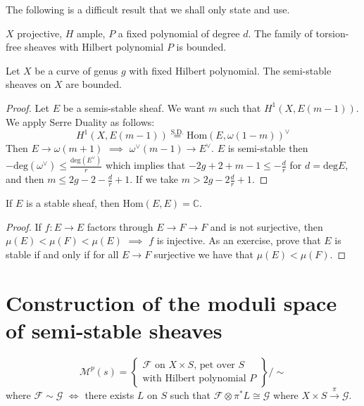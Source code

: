 The following is a difficult result that we
shall only state and use.

\begin{theorem}
\label{theorem-}
$X$ projective, $H$ ample, $P$ a fixed
polynomial of degree $d$. The family of
torsion-free sheaves with Hilbert polynomial
$P$ is bounded.
\end{theorem}

\begin{proposition}
\label{msos-label-008}
Let $X$ be a curve of genus $g$ with fixed
Hilbert polynomial. The semi-stable sheaves
on $X$ are bounded.
\end{proposition}

\begin{proof}
Let $E$ be a semis-stable sheaf. We want $m$
such that $H^{1}(X,E(m-1))$. We apply Serre
Duality as follows:
$$
H^{1}(X,E(m-1))\overset{\text{S.D.}}{=
}\text{Hom}(E,\omega(1-m))^\vee
$$Then $E \to \omega(m+1)$ $\implies$
$\omega^\vee(m-1)\to E^\vee$. $E$ is
semi-stable then
$-\text{deg}(\omega^\vee)\leq
\frac{\text{deg}(E^\vee)}{r}$
which implies that $-2g+2+m-1\leq
-\frac{d}{r}$ for $d=\text{deg}E$, and then
$m\leq  2g-2-\frac{d}{r}+1$. If we take
$m>2g-2\frac{d}{r}+1$.
\end{proof}

\begin{proposition}
\label{proposition-}
If  $E$ is a stable sheaf, then
$\text{Hom}(E,E)=\mathbb{C}$.
\end{proposition}

\begin{proof}
If $f:E \to E$ factors through $E \to F \to
F$ and is not surjective, then
$\mu(E)<\mu(F)<\mu(E)$ $\implies$ $f$ is
injective. As an exercise, prove that
$E$ is stable if and only if for all $E \to
F$ surjective we have that
$\mu(E)<\mu(F)$.
\end{proof}

\section{Construction of the moduli space of
semi-stable sheaves}
\label{msos-label-009}
$$
\mathcal{M}^p(s)=\left\{
\substack{\text{$\mathcal{F}$ on $X\times S$,
pet over $S$}
\\ \text{with Hilbert polynomial $P$}}
\right\} \Big/\sim
$$
where $\mathcal{F}\sim \mathcal{G}$ $\iff$
there exists $L$ on $S$ such that
$\mathcal{F}\otimes \pi^*L \cong \mathcal{G}$
where
$X \times S\xrightarrow{\pi}\mathcal{G}$.

